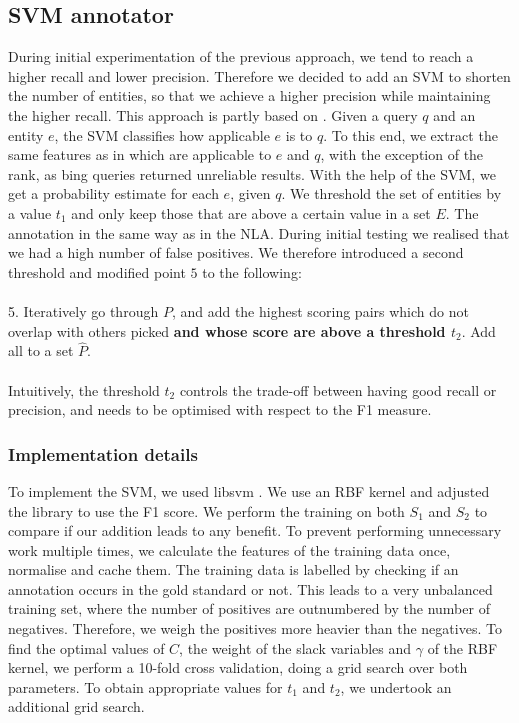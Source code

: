 \documentclass{article}
\begin{document}
\subsection{SVM annotator}
During initial experimentation of the previous approach, we tend to reach a higher recall and lower precision. Therefore we decided to add an SVM to shorten the number of entities, so that we achieve a higher precision while maintaining the higher recall. This approach is partly based on \cite{cornolti16}. Given a query $q$ and an entity $e$, the SVM classifies how applicable $e$ is to $q$. To this end, we extract the same features as in \cite{cornolti16} which are applicable to $e$ and $q$, with the exception of the rank, as bing queries returned unreliable results. With the help of the SVM, we get a probability estimate for each $e$, given $q$. We threshold the set of entities by a value $t_1$ and only keep those that are above a certain value in a set $E$. The annotation in the same way as in the NLA. During initial testing we realised that we had a high number of false positives. We therefore introduced a second threshold and modified point $5$ to the following:\\\\
5. Iteratively go through $P$, and add the highest scoring pairs which do not overlap with others picked \textbf{and whose score are above a threshold $t_2$}. Add all to a set $\hat P$.\\\\
Intuitively, the threshold $t_2$ controls the trade-off between having good recall or precision, and needs to be optimised with respect to the F1 measure.
\subsubsection{Implementation details}
To implement the SVM, we used libsvm \cite{lsvm}. We use an RBF kernel and adjusted the library to use the F1 score. We perform the training on both $S_1$ and $S_2$ to compare if our addition leads to any benefit. To prevent performing unnecessary work multiple times, we calculate the features of the training data once, normalise and cache them. The training data is labelled by checking if an annotation occurs in the gold standard or not. This leads to a very unbalanced training set, where the number of positives are outnumbered by the number of negatives. Therefore, we weigh the positives more heavier than the negatives. To find the optimal values of $C$, the weight of the slack variables and $\gamma$ of the RBF kernel, we perform a 10-fold cross validation, doing a grid search over both parameters. To obtain appropriate values for $t_1$ and $t_2$, we undertook an additional grid search.
\end{document}
